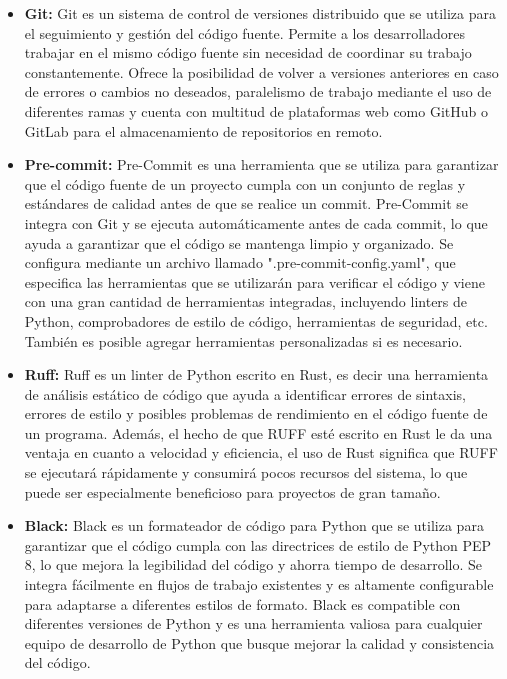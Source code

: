\begin{itemize}
    \item \textbf{Git:} Git \cite{Git} es un sistema de control de versiones distribuido que se utiliza para el 
    seguimiento y gestión del código fuente. Permite a los desarrolladores trabajar en el mismo código fuente 
    sin necesidad de coordinar su trabajo constantemente. Ofrece la posibilidad de volver a versiones anteriores en 
    caso de errores o cambios no deseados, paralelismo de trabajo mediante el uso de diferentes ramas y cuenta 
    con multitud de plataformas web como GitHub o GitLab para el almacenamiento de repositorios en remoto.

    \item \textbf{Pre-commit:} Pre-Commit \cite{pre-commit} es una herramienta que se utiliza para garantizar que el código 
    fuente de un proyecto cumpla con un conjunto de reglas y estándares de calidad antes de que se realice 
    un commit. Pre-Commit se integra con Git y se ejecuta automáticamente antes de cada commit, lo que ayuda 
    a garantizar que el código se mantenga limpio y organizado. Se configura mediante un archivo llamado 
    ".pre-commit-config.yaml", que especifica las herramientas que se utilizarán para verificar el código 
    y viene con una gran cantidad de herramientas integradas, incluyendo linters de Python, comprobadores 
    de estilo de código, herramientas de seguridad, etc. También es posible agregar herramientas 
    personalizadas si es necesario.

    \item \textbf{Ruff:} Ruff \cite{Ruff} es un linter de Python escrito en Rust, es decir una herramienta de 
    análisis estático de código que ayuda a identificar errores de sintaxis, errores de estilo y posibles 
    problemas de rendimiento en el código fuente de un programa. Además, el hecho de que RUFF esté escrito 
    en Rust le da una ventaja en cuanto a velocidad y eficiencia, el uso de Rust significa que RUFF se 
    ejecutará rápidamente y consumirá pocos recursos del sistema, lo que puede ser especialmente beneficioso 
    para proyectos de gran tamaño.

    \item \textbf{Black:} Black \cite{Black} es un formateador de código para Python que se utiliza para garantizar
    que el código cumpla con las directrices de estilo de Python PEP 8, lo que mejora la legibilidad 
    del código y ahorra tiempo de desarrollo. Se integra fácilmente en flujos de trabajo existentes 
    y es altamente configurable para adaptarse a diferentes estilos de formato. Black es compatible 
    con diferentes versiones de Python y es una herramienta valiosa para cualquier equipo de desarrollo 
    de Python que busque mejorar la calidad y consistencia del código.


\end{itemize}
